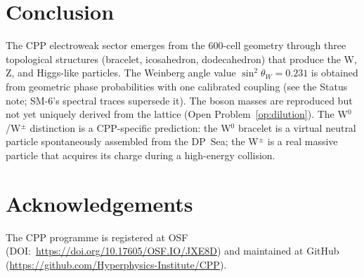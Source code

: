\documentclass[11pt,letterpaper]{article}
\begin{document}
\section{Conclusion}

The CPP electroweak sector emerges from the 600-cell geometry through
three topological structures (bracelet, icosahedron, dodecahedron)
that produce the W, Z, and Higgs-like particles.  The Weinberg angle
value $\sin^2\theta_W = 0.231$ is obtained from geometric phase probabilities with one calibrated coupling (see the Status note; SM-6's spectral traces supersede it).  The
boson masses are reproduced but not yet uniquely derived from the
lattice (Open Problem~\ref{op:dilution}).  The W$^0$/W$^\pm$
distinction is a CPP-specific prediction: the W$^0$ bracelet is a
virtual neutral particle spontaneously assembled from the DP~Sea; the
W$^\pm$ is a real massive particle that acquires its charge during a
high-energy collision.





\section*{Acknowledgements}
The CPP programme is registered at OSF (DOI:~\url{https://doi.org/10.17605/OSF.IO/JXE8D}) and maintained at GitHub (\url{https://github.com/Hyperphysics-Institute/CPP}).
\end{document}
